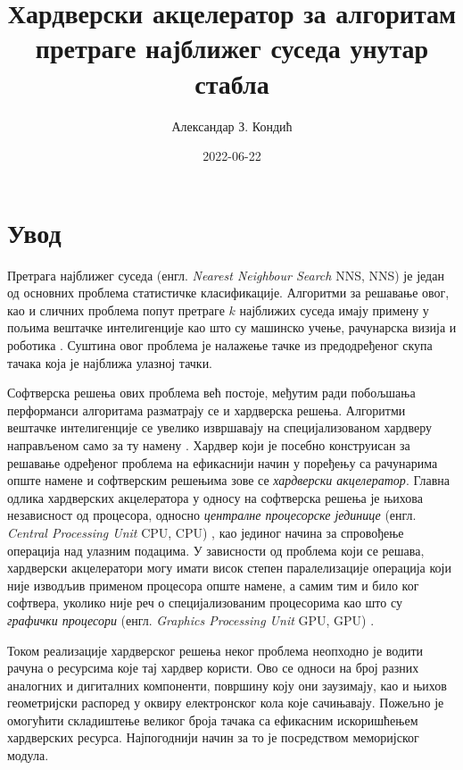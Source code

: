 \documentclass[master]{finthesis}
\title{Хардверски акцелератор за алгоритам претраге најближег суседа унутар\texorpdfstring{\\}{ }\kdim{ног} стабла}
\author{Александар З. Кондић}
\date{2022-06-22}
\makeatletter
\newcommand*{\engl}[2][\@empty]{%
    \edef\theacronym{#1}%
    (енгл. \foreignlanguage{english}{\emph{#2}%
    \ifx\theacronym\@empty \else , #1\fi})%
}
\renewcommand{\maketitle}{%
    \firsttitlepage%
    \secondtitlepage%
    \thirdtitlepage%
}
\makeatother
\begin{document}
\maketitle

\tableofcontents
{}

\makeabstract

\section{Увод}

Претрага најближег суседа \engl[NNS]{Nearest Neighbour Search} је један од основних проблема статистичке класификације. Алгоритми за решавање овог, као и сличних проблема попут претраге $k$ најближих суседа имају примену у пољима вештачке интелигенције као што су машинско учење, рачунарска визија \cite{boiman2008defense} и роботика \cite{bewley2013advantages}. Суштина овог проблема је налажење тачке из предодређеног скупа тачака која је најближа улазној тачки.

Софтверска решења ових проблема већ постоје, међутим ради побољшања перформанси алгоритама разматрају се и хардверска решења. Алгоритми вештачке интелигенције се увелико извршавају на специјализованом хардверу направљеном само за ту намену \cite{talib2021systematic}. Хардвер који је посебно конструисан за решавање одређеног проблема на ефикаснији начин у поређењу са рачунарима опште намене и софтверским решењима зове се \emph{хардверски акцелератор}. Главна одлика хардверских акцелератора у односу на софтверска решења је њихова независност од процесора, односно \emph{централне процесорске јединице} \engl[CPU]{Central Processing Unit}, као јединог начина за спровођење операција над улазним подацима. У зависности од проблема који се решава, хардверски акцелератори могу имати висок степен паралелизације операција који није изводљив применом процесора опште намене, а самим тим и било ког софтвера, уколико није реч о специјализованим процесорима као што су \emph{графички процесори} \engl[GPU]{Graphics Processing Unit}.

Током реализације хардверског решења неког проблема неопходно је водити рачуна о ресурсима које тај хардвер користи. Ово се односи на број разних аналогних и дигиталних компоненти, површину коју они заузимају, као и њихов геометријски распоред у оквиру електронског кола које сачињавају. %
Пожељно је омогућити складиштење великог броја тачака са ефикасним искоришћењем хардверских ресурса. Најпогоднији начин за то је посредством меморијског модула. 
\end{document}
